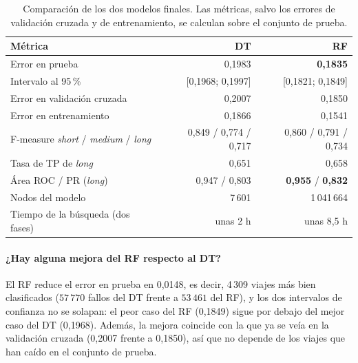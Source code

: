 \documentclass[12pt,a4paper]{article}
\begin{document}
\begin{table}[H]
\centering
\small
\begin{tabular}{lrr}
\toprule
\textbf{Métrica} & \textbf{\ac{DT}} & \textbf{\ac{RF}} \\
\midrule
Error en prueba & 0,1983 & \textbf{0,1835} \\
Intervalo al 95\,\% & [0,1968; 0,1997] & [0,1821; 0,1849] \\
Error en validación cruzada & 0,2007 & 0,1850 \\
Error en entrenamiento & 0,1866 & 0,1541 \\
\midrule
F-measure \textit{short} / \textit{medium} / \textit{long} & 0,849 / 0,774 / 0,717 & 0,860 / 0,791 / 0,734 \\
Tasa de \acs{TP} de \textit{long} & 0,651 & 0,658 \\
Área \acs{ROC} / \acs{PR} (\textit{long}) & 0,947 / 0,803 & \textbf{0,955} / \textbf{0,832} \\
\midrule
Nodos del modelo & 7\,601 & 1\,041\,664 \\
Tiempo de la búsqueda (dos fases) & unas 2 h & unas 8,5 h \\
\bottomrule
\end{tabular}
\caption{Comparación de los dos modelos finales. Las métricas, salvo los
errores de validación cruzada y de entrenamiento, se calculan sobre el
conjunto de prueba.}
\label{tab:comparacion}
\end{table}

\paragraph{¿Hay alguna mejora del \ac{RF} respecto al \ac{DT}?} El \ac{RF} reduce el error en prueba
en 0,0148, es decir, 4\,309 viajes más bien clasificados ($57\,770$ fallos
del \ac{DT} frente a $53\,461$ del \ac{RF}), y los dos intervalos
de confianza no se solapan: el peor caso del \ac{RF} (0,1849) sigue por
debajo del mejor caso del \ac{DT} (0,1968). Además, la mejora coincide con
la que ya se veía en la validación cruzada (0,2007 frente a 0,1850), así
que no depende de los viajes que han caído en el conjunto de prueba.
\end{document}
